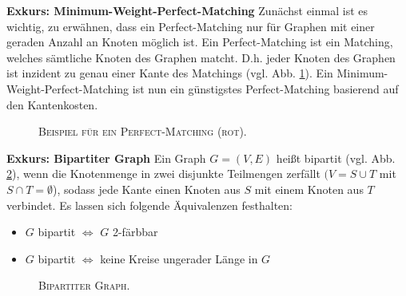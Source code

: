 \textbf{Exkurs: Minimum-Weight-Perfect-Matching}\newline
Zunächst einmal ist es wichtig, zu erwähnen, dass ein Perfect-Matching nur für Graphen mit einer geraden Anzahl an Knoten möglich ist.
Ein Perfect-Matching ist ein Matching, welches sämtliche Knoten des Graphen matcht.
D.h. jeder Knoten des Graphen ist inzident zu genau einer Kante des Matchings (vgl. Abb. \ref{fig:perfect_matching}).
Ein Minimum-Weight-Perfect-Matching ist nun ein günstigstes Perfect-Matching basierend auf den Kantenkosten.
\begin{figure}[H]
\centering
{}
\caption{\textsc{Beispiel für ein Perfect-Matching (rot).}}
\label{fig:perfect_matching}
\end{figure}

\pagebreak

\textbf{Exkurs: Bipartiter Graph}\newline
Ein Graph $G = (V, E)$ heißt bipartit (vgl. Abb. \ref{fig:bipartite_graph}), wenn die Knotenmenge in zwei disjunkte Teilmengen zerfällt
$(V = S \cup T$ mit $S \cap T = \emptyset$), sodass jede Kante einen Knoten aus $S$ mit einem Knoten aus $T$ verbindet. \cite{HochschuleDarmstadt}\newline
Es lassen sich folgende Äquivalenzen festhalten:
\begin{itemize}
  \item $G$ bipartit $\iff$ $G$ 2-färbbar
  \item $G$ bipartit $\iff$ keine Kreise ungerader Länge in $G$
\end{itemize}

\begin{figure}[H]
\centering
{}
\caption{\textsc{Bipartiter Graph.}}
\label{fig:bipartite_graph}
\end{figure}

